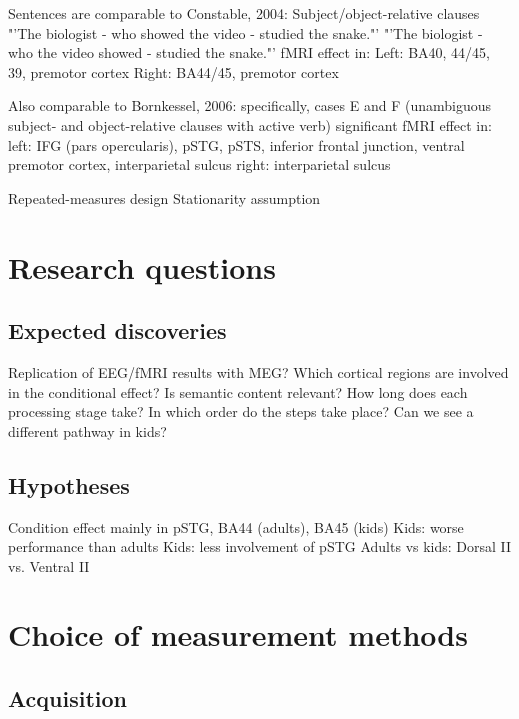 Sentences are comparable to Constable, 2004:
Subject/object-relative clauses
"'The biologist - who showed the video - studied the snake."'
"'The biologist - who the video showed - studied the snake."'
fMRI effect in:
Left: BA40, 44/45, 39, premotor cortex
Right: BA44/45, premotor cortex

Also comparable to Bornkessel, 2006:
specifically, cases E and F (unambiguous subject- and object-relative clauses with active verb)
significant fMRI effect in:
left: IFG (pars opercularis), pSTG, pSTS, inferior frontal junction, ventral premotor cortex, interparietal sulcus
right: interparietal sulcus

Repeated-measures design
Stationarity assumption

\section{Research questions}

\subsection{Expected discoveries}
Replication of EEG/fMRI results with MEG?
Which cortical regions are involved in the conditional effect?
Is semantic content relevant?
How long does each processing stage take?
In which order do the steps take place?
Can we see a different pathway in kids?

\subsection{Hypotheses}
Condition effect mainly in pSTG, BA44 (adults), BA45 (kids)
Kids: worse performance than adults
Kids: less involvement of pSTG
Adults vs kids: Dorsal II vs. Ventral II\section{Choice of measurement methods}

\subsection{Acquisition}

